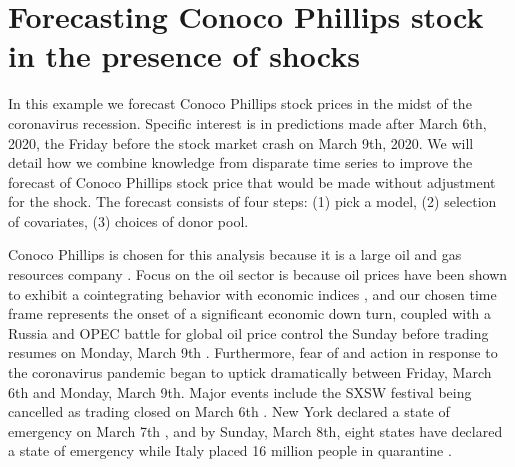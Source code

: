 \documentclass[11pt]{article}
\theoremstyle{definition}
\begin{document}





\section{Forecasting Conoco Phillips stock in the presence of shocks}
\label{forecasting}
In this example we forecast Conoco Phillips stock prices in the midst of the coronavirus recession. Specific interest is in predictions made after March 6th, 2020, the Friday before the stock market crash on March 9th, 2020. We will detail how we combine knowledge from disparate time series to improve the forecast of Conoco Phillips stock price that would be made without adjustment for the shock. The forecast consists of four steps: (1) pick a model, (2) selection of covariates,  (3) choices of donor pool. %


Conoco Phillips is chosen for this analysis because it is a large oil and gas resources company \citep{conocowhatwedo}. %
Focus on the oil sector is because oil prices have been shown to exhibit a cointegrating behavior with economic indices \citep{he2010global}, and our chosen time frame represents the onset of a significant economic down turn, coupled with a Russia and OPEC battle for global oil price control the Sunday before trading resumes on Monday, March 9th \citep{sukhankin2020russian}. Furthermore, fear of and action in response to the coronavirus pandemic began to uptick dramatically between Friday, March 6th and Monday, March 9th. Major events include the SXSW festival being cancelled as trading closed on March 6th \citep{wang2020impact}. New York declared a state of emergency on March 7th \citep{nygov}, and by Sunday, March 8th, eight states have declared a state of emergency \citep{alonso2020state} while Italy placed 16 million people in quarantine \citep{sjodin2020only}.
\end{document}
